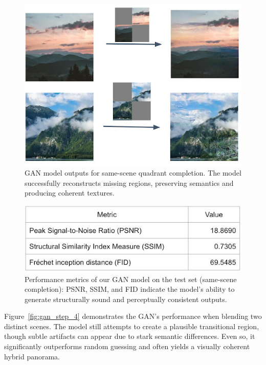 \documentclass[sigconf]{acmart}
\begin{document}
\begin{figure}[h!]
    \centering
    \includegraphics[width=\linewidth]{gan_step_2}
    \caption{GAN model outputs for same-scene quadrant completion. The model successfully reconstructs missing regions, preserving semantics and producing coherent textures.}
    \label{fig:gan_step_2}
\end{figure}

\begin{figure}[h!]
    \centering
    \includegraphics[width=\linewidth]{gan_metrics}
    \caption{Performance metrics of our GAN model on the test set (same-scene completion): PSNR, SSIM, and FID indicate the model’s ability to generate structurally sound and perceptually consistent outputs.}
    \label{fig:gan_metrics}
\end{figure}

Figure~\ref{fig:gan_step_4} demonstrates the GAN’s performance when blending two distinct scenes. The model still attempts to create a plausible transitional region, though subtle artifacts can appear due to stark semantic differences. Even so, it significantly outperforms random guessing and often yields a visually coherent hybrid panorama.
\end{document}
